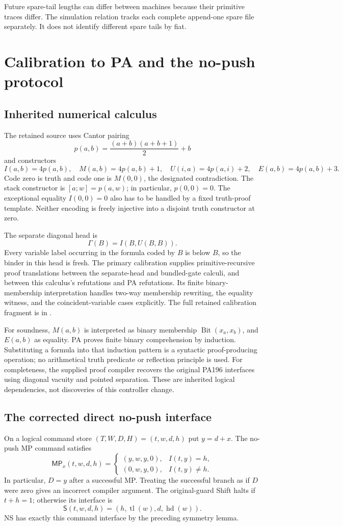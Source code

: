 \documentclass[11pt,a4paper]{article}
\newcommand{\MP}{\mathsf{MP}}
\newcommand{\Shift}{\mathsf{S}}
\newcommand{\file}[1]{\path{#1}}
\begin{document}
Future spare-tail lengths can differ between machines because their
primitive traces differ. The simulation relation tracks each complete
append-one spare file separately. It does not identify different spare
tails by fiat.

\section{Calibration to PA and the no-push protocol}
\subsection{Inherited numerical calculus}
The retained source uses Cantor pairing
\[
 p(a,b)=\frac{(a+b)(a+b+1)}2+b
\]
and constructors
\[
 I(a,b)=4p(a,b),\quad M(a,b)=4p(a,b)+1,\quad
 U(i,a)=4p(a,i)+2,\quad E(a,b)=4p(a,b)+3.
\]
Code zero is truth and code one is $M(0,0)$, the designated contradiction.
The stack constructor is $[a;w]=p(a,w)$; in particular,
$p(0,0)=0$. The exceptional equality $I(0,0)=0$ also has to be handled
by a fixed truth-proof template. Neither encoding is freely injective
into a disjoint truth constructor at zero.

The separate diagonal head is
\[
 \Gamma(B)=I(B,U(B,B)).
\]
Every variable label occurring in the formula coded by $B$ is below $B$,
so the binder in this head is fresh. The primary calibration supplies
primitive-recursive proof translations between the separate-head and
bundled-gate calculi, and between this calculus's refutations and PA
refutations. Its finite binary-membership interpretation handles
two-way membership rewriting, the equality witness, and the
coincident-variable cases explicitly. The full retained calibration
fragment is in \file{reference/pa194_calibration.tex}.

For soundness, $M(a,b)$ is interpreted as binary membership
$\operatorname{Bit}(x_a,x_b)$, and $E(a,b)$ as equality. PA proves
finite binary comprehension by induction. Substituting a formula
into that induction pattern is a syntactic proof-producing operation;
no arithmetical truth predicate or reflection principle is used.
For completeness, the supplied proof compiler recovers the original
PA196 interfaces using diagonal vacuity and pointed separation.
These are inherited logical dependencies, not discoveries of this
controller change.

\subsection{The corrected direct no-push interface}
On a logical command store $(T,W,D,H)=(t,w,d,h)$ put $y=d+x$.
The no-push MP command satisfies
\[
 \MP_x(t,w,d,h)=
 \begin{cases}
   (y,w,y,0),& I(t,y)=h,\\
   (0,w,y,0),& I(t,y)\ne h.
 \end{cases}
\]
In particular, $D=y$ after a successful MP. Treating the successful
branch as if $D$ were zero gives an incorrect compiler argument.
The original-guard Shift halts if $t+h=1$; otherwise its interface is
\[
  \Shift(t,w,d,h)=(h,\operatorname{tl}(w),d,\operatorname{hd}(w)).
\]
NS has exactly this command interface by the preceding symmetry lemma.
\end{document}
